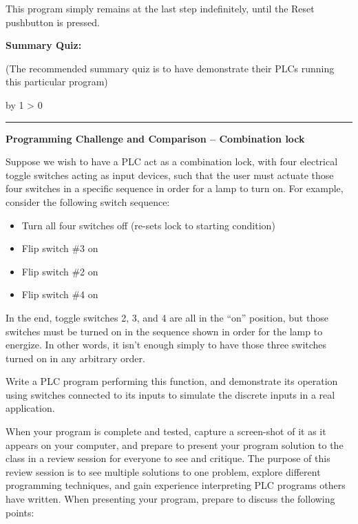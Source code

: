 \documentclass[12pt,a4paper]{article}
\def\oppgave{
            \advance\questnum by 1
            \ifnum \questnum > 0
                 \hrule
                 \vskip 3pt
                 \leftline{Oppgave \the\questnum}
                 \vskip 3pt \fi}
\begin{document}
This program simply remains at the last step indefinitely, until the Reset pushbutton is pressed.






\vfil \eject

\noindent
{\bf Summary Quiz:}

(The recommended summary quiz is to have  demonstrate their PLCs running this particular program)


\vfil \eject 



\oppgave{} 

\noindent
{\bf Programming Challenge and Comparison -- Combination lock}

\vskip 10pt

Suppose we wish to have a PLC act as a combination lock, with four electrical toggle switches acting as input devices, such that the user must actuate those four switches in a specific sequence in order for a lamp to turn on.  For example, consider the following switch sequence:

\begin{itemize}
\item{} Turn all four switches off (re-sets lock to starting condition)
\item{} Flip switch \#3 on
\item{} Flip switch \#2 on
\item{} Flip switch \#4 on
\end{itemize}

In the end, toggle switches 2, 3, and 4 are all in the ``on'' position, but those switches must be turned on in the sequence shown in order for the lamp to energize.  In other words, it isn't enough simply to have those three switches turned on in any arbitrary order.

Write a PLC program performing this function, and demonstrate its operation using switches connected to its inputs to simulate the discrete inputs in a real application.  

\vskip 10pt

When your program is complete and tested, capture a screen-shot of it as it appears on your computer, and prepare to present your program solution to the class in a review session for everyone to see and critique.  The purpose of this review session is to see multiple solutions to one problem, explore different programming techniques, and gain experience interpreting PLC programs others have written.  When presenting your program, prepare to discuss the following points:
\end{document}
